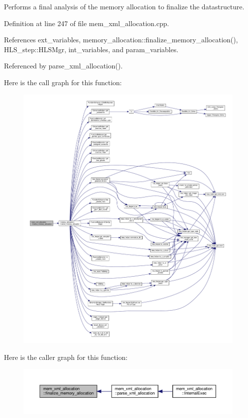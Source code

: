 Performs a final analysis of the memory allocation to finalize the datastructure. 



Definition at line 247 of file mem\+\_\+xml\+\_\+allocation.\+cpp.



References ext\+\_\+variables, memory\+\_\+allocation\+::finalize\+\_\+memory\+\_\+allocation(), H\+L\+S\+\_\+step\+::\+H\+L\+S\+Mgr, int\+\_\+variables, and param\+\_\+variables.



Referenced by parse\+\_\+xml\+\_\+allocation().

Here is the call graph for this function\+:
\nopagebreak
\begin{figure}[H]
\begin{center}
\leavevmode
\includegraphics[width=350pt]{d2/d51/classmem__xml__allocation_a138ace3d0d2e08742168d52adb53191f_cgraph}
\end{center}
\end{figure}
Here is the caller graph for this function\+:
\nopagebreak
\begin{figure}[H]
\begin{center}
\leavevmode
\includegraphics[width=350pt]{d2/d51/classmem__xml__allocation_a138ace3d0d2e08742168d52adb53191f_icgraph}
\end{center}
\end{figure}
